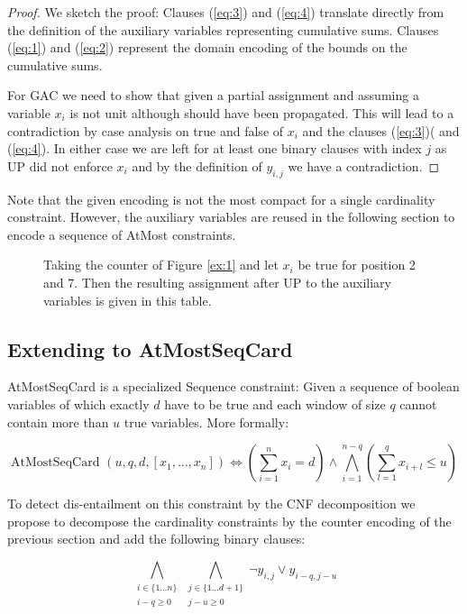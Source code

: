 \documentclass[]{llncs}
\newcommand{\AtMostSeqCard}{AtMostSeqCard }
\begin{document}
\begin{proof}
    We sketch the proof: Clauses (\ref{eq:3}) and (\ref{eq:4}) translate
    directly from the definition of the auxiliary variables representing
    cumulative sums.  Clauses (\ref{eq:1}) and (\ref{eq:2}) represent
    the domain encoding of the bounds on the cumulative sums. 
    
    For GAC we need to show that given a partial assignment and assuming
    a variable $x_i$ is not unit although should have been propagated.
    This will lead to a contradiction by case analysis on true and false
    of $x_i$ and the clauses (\ref{eq:3})( and (\ref{eq:4}). In either
    case we are left for at least one binary clauses with index $j$ as
    UP did not enforce $x_i$ and by the definition of $y_{i,j}$ we have a
    contradiction. 
\end{proof}

Note that the given encoding is not the most compact for a single
cardinality constraint.  However, the auxiliary variables are reused in
the following section to encode a sequence of AtMost constraints.        


\begin{figure}
\centering 
\caption{Taking the counter of Figure \ref{ex:1} and let $x_{i}$ be
true for position 2 and 7. Then the resulting assignment after UP to the
auxiliary variables is given in this table. } 

\label{ex:2}
\end{figure}


\subsection{Extending to \AtMostSeqCard}

\AtMostSeqCard is a specialized Sequence constraint: Given a sequence of
boolean variables of which exactly $d$ have to be true and each window
of size $q$ cannot contain more than $u$ true variables. More formally: 

$$ \text{\AtMostSeqCard}(u,q,d,[x_{1},\ldots,x_{n}]) \iff (\sum_{i=1}^n
x_{i} = d) \wedge \bigwedge_{i=1}^{n-q}(\sum_{l=1}^q x_{i+l} \leq u )$$

To detect dis-entailment on this constraint by the CNF decomposition we
propose to decompose the cardinality constraints by the counter encoding
of the previous section and add the following binary clauses:

\begin{equation} \label{eq:6}
    \bigwedge_{\substack{i \in \{1 \ldots n\} \\ i-q \geq 0}}
    \bigwedge_{\substack{j\in\{1\ldots d+1\}\\ j-u \geq 0}}
    \neg y_{i,j} \vee y_{i-q,j-u}
\end{equation}               
\end{document}
